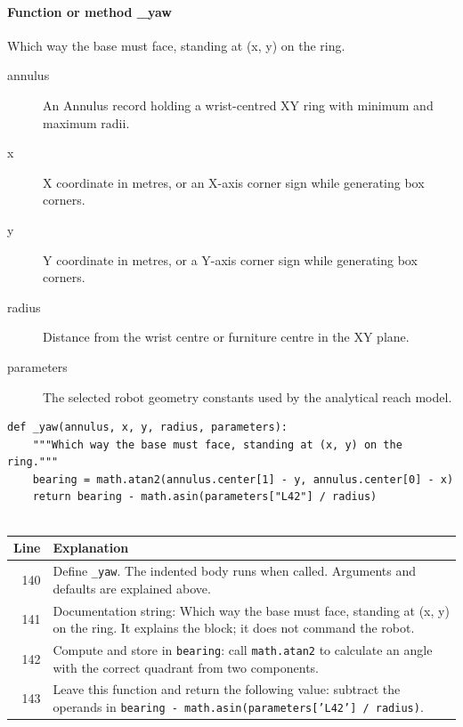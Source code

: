 \documentclass[11pt,a4paper]{book}
\begin{document}
\paragraph{Function or method \_yaw}
Which way the base must face, standing at (x, y) on the ring.

\begin{description}
\item[annulus] An Annulus record holding a wrist-centred XY ring with minimum and maximum radii.
\item[x] X coordinate in metres, or an X-axis corner sign while generating box corners.
\item[y] Y coordinate in metres, or a Y-axis corner sign while generating box corners.
\item[radius] Distance from the wrist centre or furniture centre in the XY plane.
\item[parameters] The selected robot geometry constants used by the analytical reach model.
\end{description}

\begin{lstlisting}[firstnumber=140]
def _yaw(annulus, x, y, radius, parameters):
    """Which way the base must face, standing at (x, y) on the ring."""
    bearing = math.atan2(annulus.center[1] - y, annulus.center[0] - x)
    return bearing - math.asin(parameters["L42"] / radius)


\end{lstlisting}

\begin{longtable}{r p{}}

\textbf{Line} & \textbf{Explanation} \\ \hline \endhead

140 & Define \texttt{\_yaw}. The indented body runs when called. Arguments and defaults are explained above. \\

141 & Documentation string: Which way the base must face, standing at (x, y) on the ring. It explains the block; it does not command the robot. \\

142 & Compute and store in \texttt{bearing}: call \texttt{math.atan2} to calculate an angle with the correct quadrant from two components.  \\

143 & Leave this function and return the following value: subtract the operands in \texttt{bearing - math.asin(parameters['L42'] / radius)}. \\

\end{longtable}
\end{document}
